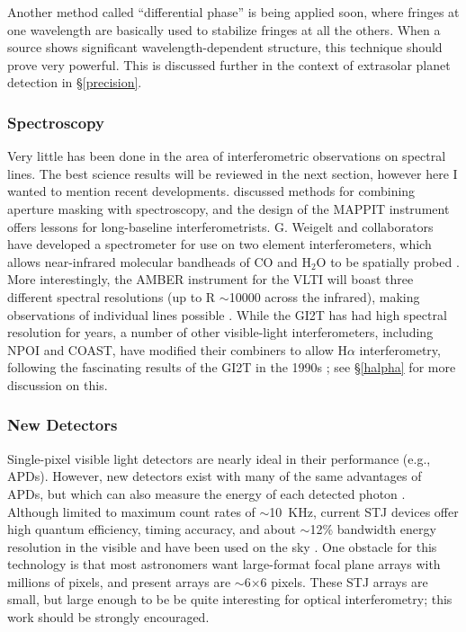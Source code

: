 \documentclass[12pt]{article}
\begin{document}
Another method called ``differential phase'' is being applied soon, where
fringes at one wavelength are basically used to stabilize fringes at all the 
others. When a source shows significant wavelength-dependent 
structure, this technique should prove very powerful. 
This is discussed further in the context of extrasolar planet detection in 
\S\ref{precision}.

\subsubsection{Spectroscopy}

Very little has been done in the area of interferometric observations
on spectral lines.  The best science results will be reviewed in the
next section, however here I wanted to mention recent developments.
\citet{bedding1994} discussed methods for combining aperture masking
with spectroscopy, and the design of the MAPPIT instrument offers
lessons for long-baseline interferometrists.  G. Weigelt and
collaborators have developed a spectrometer for use on two element
interferometers, which allows near-infrared molecular bandheads of CO
and H$_2$O to be spatially probed
\citep[e.g.][]{weigelt2000,hofmann2002}.  More interestingly, the
AMBER instrument for the VLTI will boast three different spectral
resolutions (up to R $\sim$10000 across the infrared), making
observations of individual lines possible
\citep[e.g.,][]{petrov2000}.  While the GI2T has had high spectral
resolution for years, a number of other visible-light interferometers,
including NPOI and COAST, have modified their combiners to allow
H$\alpha$ interferometry, following the fascinating results of the
GI2T in the 1990s \citep[e.g.,][]{vakili1998}; see \S\ref{halpha} for
more discussion on this.

\subsubsection{New Detectors}
Single-pixel visible light detectors are nearly ideal in their performance
(e.g., APDs).
However, new detectors exist with many of the same
advantages of APDs, but which can also measure the energy of each
detected photon \citep[Superconducting Tunnel Junction
detectors,][]{peacock1997}.  Although limited to maximum count rates
of $\sim$10~KHz, current STJ devices offer high quantum
efficiency, timing accuracy, and about $\sim$12\% bandwidth energy
resolution in the visible and have been used on the sky
\citep{perryman2001}.  One obstacle for this technology is that most
astronomers want large-format focal plane arrays with millions of
pixels, and present arrays are $\sim$6$\times$6 pixels.  These STJ
arrays are small, but large enough to be be quite interesting for
optical interferometry; this work should be strongly encouraged.
\end{document}
